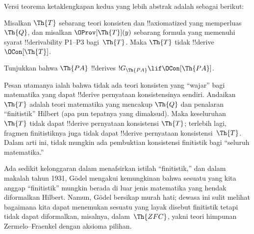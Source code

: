\documentclass[../../../include/open-logic-section]{subfiles}
\begin{document}
Versi teorema ketaklengkapan kedua yang lebih abstrak adalah sebagai berikut:

\begin{thm}
 Misalkan $\Th{T}$ sebarang teori
konsisten dan !!{axiomatized} yang memperluas $\Th{Q}$, dan misalkan
$\OProv[\Th{T}](y)$ sebarang formula yang memenuhi syarat !!{derivability}
P1--P3 bagi~$\Th{T}$. Maka $\Th{T}$ tidak !!{derive}~$\OCon[\Th{T}]$.
\end{thm}

\begin{prob}
Tunjukkan bahwa $\Th{PA}$ !!{derive}s
$!G_{\Th{PA}} \lif \OCon[\Th{PA}]$.
\end{prob}

\begin{digress}
Pesan utamanya ialah bahwa tidak ada teori konsisten yang ``wajar'' bagi
matematika yang dapat !!{derive} pernyataan konsistensinya sendiri. Andaikan
$\Th{T}$ adalah teori matematika yang mencakup $\Th{Q}$ dan penalaran
``finitistik'' Hilbert (apa pun tepatnya yang dimaksud). Maka keseluruhan
$\Th{T}$ tidak dapat !!{derive} pernyataan konsistensi $\Th{T}$; terlebih
lagi, fragmen finitistiknya juga tidak dapat !!{derive} pernyataan
konsistensi~$\Th{T}$. Dalam arti ini, tidak mungkin ada pembuktian
konsistensi finitistik bagi ``seluruh matematika.''

Ada sedikit kelonggaran dalam menafsirkan istilah ``finitistik,'' dan dalam
makalah tahun 1931, G\"odel mengakui kemungkinan bahwa sesuatu yang kita
anggap ``finitistik'' mungkin berada di luar jenis matematika yang hendak
diformalkan Hilbert. Namun, G\"odel bersikap murah hati; dewasa ini sulit
melihat bagaimana kita dapat menemukan sesuatu yang layak disebut finitistik
tetapi tidak dapat diformalkan, misalnya, dalam~$\Th{ZFC}$, yakni teori
himpunan Zermelo--Fraenkel dengan aksioma pilihan.
\end{digress}
\end{document}
